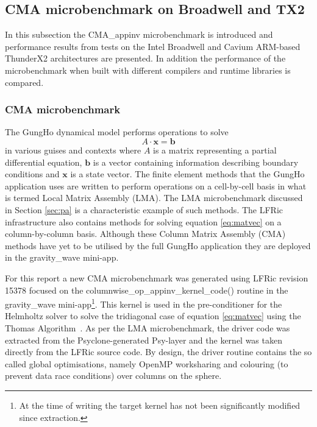 \subsection{CMA microbenchmark on Broadwell and TX2}
\label{sec:pa-microbenchmark}
In this subsection the CMA\_appinv microbenchmark is introduced and performance results from tests on the Intel Broadwell and Cavium ARM-based ThunderX2 architectures are presented.
In addition the performance of the microbenchmark when built with different compilers and runtime libraries is compared.

\subsubsection{CMA microbenchmark}

The GungHo dynamical model performs operations to solve
\begin{equation} \label{eq:matvec}
A \cdot \mathbf{x} = \mathbf{b}
\end{equation}
in various guises and contexts where $A$ is a matrix representing a partial differential equation, $\mathbf{b}$ is a vector containing information describing boundary conditions and $\mathbf{x}$ is a state vector.
The finite element methods that the GungHo application uses are written to perform operations on a cell-by-cell basis in what is termed Local Matrix Assembly (LMA).
The LMA microbenchmark discussed in Section \ref{sec:pa} is a characteristic example of such methods.
The LFRic infrastructure also contains methods for solving equation \ref{eq:matvec} on a column-by-column basis.
Although these Column Matrix Assembly (CMA) methods have yet to be utilised by the full GungHo application they are deployed in the gravity\_wave mini-app.

For this report a new CMA microbenchmark was generated using LFRic revision 15378 focused on the columnwise\_op\_appinv\_kernel\_code() routine in the gravity\_wave mini-app\footnote{At the time of writing the target kernel has not been significantly modified since extraction.}.
This kernel is used in the pre-conditioner for the Helmholtz solver to solve the tridiagonal case of equation \ref{eq:matvec} using the Thomas Algorithm~\cite{numericalrecipes}.
As per the LMA microbenchmark, the driver code was extracted from the Psyclone-generated Psy-layer and the kernel was taken directly from the LFRic source code.
By design, the driver routine contains the so called global optimisations, namely OpenMP worksharing and colouring (to prevent data race conditions) over columns on the sphere.

